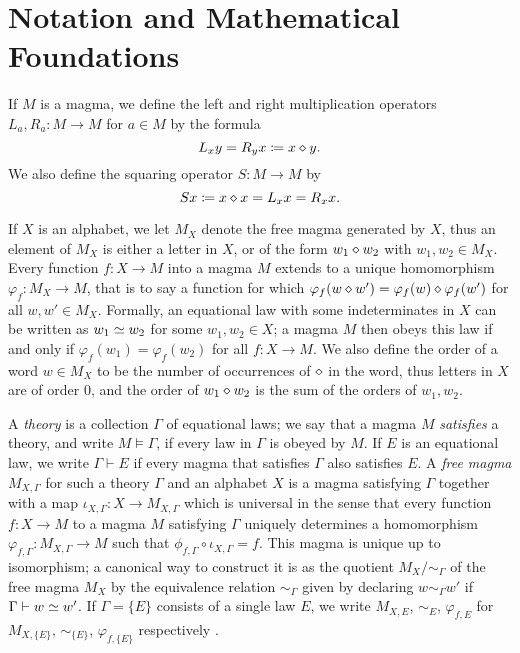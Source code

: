 \section{Notation and Mathematical Foundations}\label{notation-sec}

If $M$ is a magma, we define the left and right multiplication operators $L_a, R_a \colon M \to M$ for $a \in M$ by the formula
\begin{equation}\label{left-right}
    L_x y = R_y x \coloneqq x \diamond y.
\end{equation}
We also define the squaring operator $S \colon M \to M$ by
\begin{equation}\label{square-def}
    Sx \coloneqq x \diamond x = L_x x = R_x x.
\end{equation}

If $X$ is an alphabet, we let $M_X$ denote the free magma generated by $X$, thus an element of $M_X$ is either a letter in $X$, or of the form $w_1 \diamond w_2$ with $w_1,w_2 \in M_X$.  Every function $f \colon X \to M$ into a magma $M$ extends to a unique homomorphism $\varphi_f \colon M_X \to M$, that is to say a function for which $\varphi_f(w \diamond w') = \varphi_f(w) \diamond \varphi_f(w')$ for all $w,w' \in M_X$.  Formally, an equational law with some indeterminates in $X$ can be written as $w_1 \simeq w_2$ for some $w_1, w_2 \in X$; a magma $M$ then obeys this law if and only if $\varphi_f(w_1) = \varphi_f(w_2)$ for all $f \colon X \to M$.  We also define the order of a word $w \in M_X$ to be the number of occurrences of $\diamond$ in the word, thus letters in $X$ are of order $0$, and the order of $w_1 \diamond w_2$ is the sum of the orders of $w_1, w_2$.

A \emph{theory} is a collection $\Gamma$ of equational laws; we say that a magma $M$ \emph{satisfies} a theory, and write $M \models \Gamma$, if every law in $\Gamma$ is obeyed by $M$.  If $E$ is an equational law, we write $\Gamma \vdash E$ if every magma that satisfies $\Gamma$ also satisfies $E$. A \emph{free magma} $M_{X,\Gamma}$ for such a theory $\Gamma$ and an alphabet $X$ is a magma satisfying $\Gamma$ together with a map $\iota_{X,\Gamma} \colon X \to M_{X,\Gamma}$ which is universal in the sense that every function $f \colon X \to M$ to a magma $M$ satisfying $\Gamma$ uniquely determines a homomorphism $\varphi_{f,\Gamma} \colon M_{X,\Gamma} \to M$ such that $\phi_{f,\Gamma} \circ \iota_{X,\Gamma} = f$.  This magma is unique up to isomorphism; a canonical way to construct it is as the quotient $M_X/\sim_\Gamma$ of the free magma $M_X$ by the equivalence relation $\sim_\Gamma$ given by declaring $w \sim_\Gamma w'$ if $\Gamma \vdash w \simeq w'$.  If $\Gamma = \{E\}$ consists of a single law $E$, we write $M_{X,E}$, $\sim_E$, $\varphi_{f,E}$ for $M_{X,\{E\}}$, $\sim_{\{E\}}$, $\varphi_{f,\{E\}}$ respectively . 


